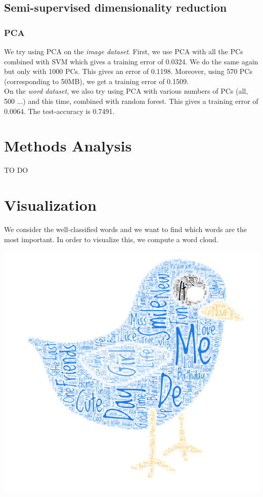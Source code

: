 \documentclass[11pt,twocolumn]{report}
\begin{document}
    \subsection*{Semi-supervised dimensionality reduction}
    \subsubsection*{PCA}
    We try using PCA on the \textit{image dataset}. First, we use PCA with all the PCs combined with SVM which gives a training error of 0.0324. We do the same again but only with 1000 PCs. This gives an error of 0.1198. Moreover, using 570 PCs (corresponding to 50MB), we get a training error of 0.1509.\\
    
    
   On the \textit{word dataset}, we also try using PCA with various numbers of PCs (all, 500 ...) and this time, combined with random forest. This gives a training error of 0.0064. The test-accuracy is 0.7491.\\
    
    

\section *{Methods Analysis}
TO DO
\section*{Visualization}
    We consider the well-classified words and we want to find which words are the most important. In order to visualize this, we compute a word cloud. 
    
    \begin{center}
    \includegraphics[scale=0.3]{cloud}
    \end{center}
    
\end{document}

